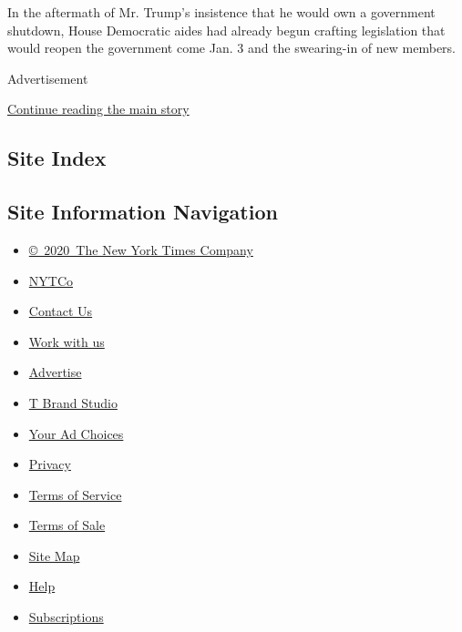 In the aftermath of Mr. Trump's insistence that he would own a
government shutdown, House Democratic aides had already begun crafting
legislation that would reopen the government come Jan. 3 and the
swearing-in of new members.

Advertisement

\protect\hyperlink{after-bottom}{Continue reading the main story}

\hypertarget{site-index}{%
\subsection{Site Index}\label{site-index}}

\hypertarget{site-information-navigation}{%
\subsection{Site Information
Navigation}\label{site-information-navigation}}

\begin{itemize}
\tightlist
\item
  \href{https://help.nytimes3xbfgragh.onion/hc/en-us/articles/115014792127-Copyright-notice}{©~2020~The
  New York Times Company}
\end{itemize}

\begin{itemize}
\tightlist
\item
  \href{https://www.nytco.com/}{NYTCo}
\item
  \href{https://help.nytimes3xbfgragh.onion/hc/en-us/articles/115015385887-Contact-Us}{Contact
  Us}
\item
  \href{https://www.nytco.com/careers/}{Work with us}
\item
  \href{https://nytmediakit.com/}{Advertise}
\item
  \href{http://www.tbrandstudio.com/}{T Brand Studio}
\item
  \href{https://www.nytimes3xbfgragh.onion/privacy/cookie-policy\#how-do-i-manage-trackers}{Your
  Ad Choices}
\item
  \href{https://www.nytimes3xbfgragh.onion/privacy}{Privacy}
\item
  \href{https://help.nytimes3xbfgragh.onion/hc/en-us/articles/115014893428-Terms-of-service}{Terms
  of Service}
\item
  \href{https://help.nytimes3xbfgragh.onion/hc/en-us/articles/115014893968-Terms-of-sale}{Terms
  of Sale}
\item
  \href{https://spiderbites.nytimes3xbfgragh.onion}{Site Map}
\item
  \href{https://help.nytimes3xbfgragh.onion/hc/en-us}{Help}
\item
  \href{https://www.nytimes3xbfgragh.onion/subscription?campaignId=37WXW}{Subscriptions}
\end{itemize}
